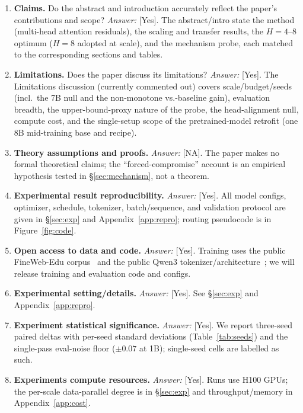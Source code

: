 \documentclass{article}
\begin{document}
\begin{enumerate}
\item \textbf{Claims.} Do the abstract and introduction accurately reflect the paper's
contributions and scope? \emph{Answer:} [Yes]. The abstract/intro state the method
(multi-head attention residuals), the scaling and transfer results, the $H{=}4$--$8$
optimum ($H{=}8$ adopted at scale), and the mechanism probe, each matched to the
corresponding sections and tables.

\item \textbf{Limitations.} Does the paper discuss its limitations? \emph{Answer:} [Yes].
The Limitations discussion (currently commented out) covers scale/budget/seeds (incl.\ the 7B null and the
non-monotone vs.-baseline gain), evaluation breadth, the upper-bound-proxy nature of the
probe, the head-alignment null, compute cost, and the single-setup scope of the
pretrained-model retrofit (one 8B mid-training base and recipe).

\item \textbf{Theory assumptions and proofs.} \emph{Answer:} [NA]. The paper makes no
formal theoretical claims; the ``forced-compromise'' account is an empirical hypothesis
tested in \S\ref{sec:mechanism}, not a theorem.

\item \textbf{Experimental result reproducibility.} \emph{Answer:} [Yes]. All model
configs, optimizer, schedule, tokenizer, batch/sequence, and validation protocol are given
in \S\ref{sec:exp} and Appendix~\ref{app:repro}; routing pseudocode is in
Figure~\ref{fig:code}.

\item \textbf{Open access to data and code.} \emph{Answer:} [Yes]. Training uses the public
FineWeb-Edu corpus~\citep{penedo2024fineweb} and the public Qwen3
tokenizer/architecture~\citep{qwen2025qwen3}; we will release training and evaluation code
and configs.

\item \textbf{Experimental setting/details.} \emph{Answer:} [Yes]. See \S\ref{sec:exp} and
Appendix~\ref{app:repro}.

\item \textbf{Experiment statistical significance.} \emph{Answer:} [Yes]. We report
three-seed paired deltas with per-seed standard deviations (Table~\ref{tab:seeds}) and the
single-pass eval-noise floor ($\pm0.07$ at 1B); single-seed cells are labelled as such.

\item \textbf{Experiments compute resources.} \emph{Answer:} [Yes]. Runs use H100 GPUs; the
per-scale data-parallel degree is in \S\ref{sec:exp} and throughput/memory in
Appendix~\ref{app:cost}.


\end{enumerate}
\end{document}

